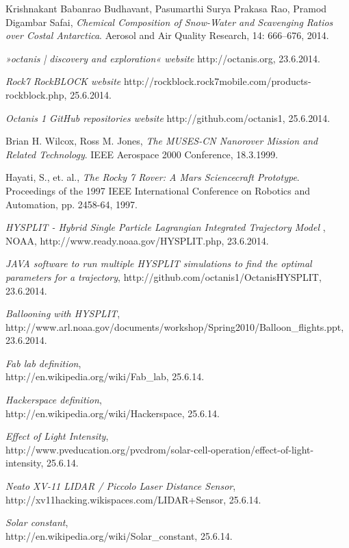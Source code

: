 \documentclass[a4paper,12pt]{article}
\begin{document}
\pagebreak
\pagestyle{empty}
\begin{thebibliography}{1}


  Krishnakant Babanrao Budhavant, Pasumarthi Surya Prakasa Rao, Pramod Digambar Safai,
  \emph{Chemical Composition of Snow-Water and Scavenging Ratios over Costal Antarctica}.
  Aerosol and Air Quality Research, 14: 666–676, 2014.

{\em »octanis | discovery and exploration« website} http://octanis.org, 23.6.2014.

{\em Rock7 RockBLOCK website} http://rockblock.rock7mobile.com/products-rockblock.php, 25.6.2014.


{\em Octanis 1 GitHub repositories website} http://github.com/octanis1, 25.6.2014.

  Brian H. Wilcox, Ross M. Jones, 
  \emph{The MUSES-CN Nanorover Mission and Related Technology}.
  IEEE Aerospace 2000 Conference, 18.3.1999.


  Hayati, S., et. al., 
  \emph{The Rocky 7 Rover: A Mars Sciencecraft Prototype}.
  Proceedings of the 1997 IEEE International Conference on Robotics and Automation, pp. 2458-64, 1997.

  {\em HYSPLIT - Hybrid Single Particle Lagrangian Integrated Trajectory Model }, NOAA, http://www.ready.noaa.gov/HYSPLIT.php, 23.6.2014.

  {\em JAVA software to run multiple HYSPLIT simulations to find the optimal parameters for a trajectory}, http://github.com/octanis1/OctanisHYSPLIT, 23.6.2014.

	{\em Ballooning with HYSPLIT}, \\
	http://www.arl.noaa.gov/documents/workshop/Spring2010/Balloon\_flights.ppt, 23.6.2014.

	{\em Fab lab definition}, \\
	http://en.wikipedia.org/wiki/Fab\_lab, 25.6.14.

	{\em Hackerspace definition}, \\
	http://en.wikipedia.org/wiki/Hackerspace, 25.6.14.

	{\em Effect of Light Intensity}, \\
	http://www.pveducation.org/pvcdrom/solar-cell-operation/effect-of-light-intensity, 25.6.14.

	{\em Neato XV-11 LIDAR / Piccolo Laser Distance Sensor}, \\
	http://xv11hacking.wikispaces.com/LIDAR+Sensor, 25.6.14.

	{\em Solar constant}, \\
	http://en.wikipedia.org/wiki/Solar\_constant, 25.6.14.

\end{thebibliography}
\end{document}
